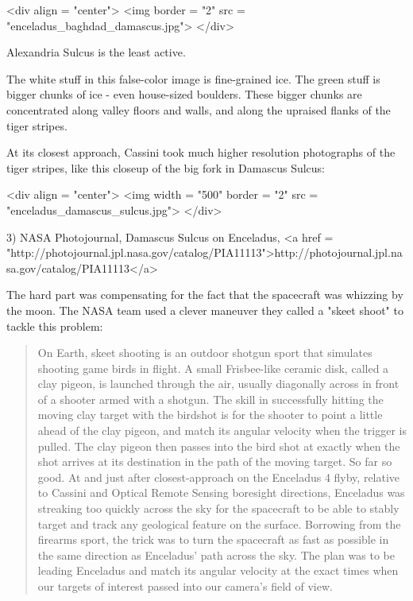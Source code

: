 <div align = "center">
<img border = "2" src = "enceladus_baghdad_damascus.jpg">
</div>

Alexandria Sulcus is the least active.  

The white stuff in this false-color image is fine-grained ice.  The
green stuff is bigger chunks of ice - even house-sized boulders.
These bigger chunks are concentrated along valley floors and walls, 
and along the upraised flanks of the tiger stripes.

At its closest approach, Cassini took much higher resolution
photographs of the tiger stripes, like this closeup of the big fork in
Damascus Sulcus:

<div align = "center">
<img width = "500" border = "2" src = "enceladus_damascus_sulcus.jpg">
</div>

3) NASA Photojournal, Damascus Sulcus on Enceladus,
<a href = "http://photojournal.jpl.nasa.gov/catalog/PIA11113">http://photojournal.jpl.nasa.gov/catalog/PIA11113</a>

The hard part was compensating for the fact that the spacecraft was
whizzing by the moon.  The NASA team used a clever maneuver they
called a "skeet shoot" to tackle this problem:

\begin{quote}
     On Earth, skeet shooting is an outdoor shotgun sport that           
     simulates shooting game birds in flight.  A small Frisbee-like 
     ceramic disk, called a clay pigeon, is launched through the air, 
     usually diagonally across in front of a shooter armed with a 
     shotgun.  The skill in successfully hitting the moving clay      
     target with the birdshot is for the shooter to point a little     
     ahead of the clay pigeon, and match its angular velocity when 
     the trigger is pulled.  The clay pigeon then passes into the 
     bird shot at exactly when the shot arrives at its destination 
     in the path of the moving target.  So far so good.  At and just
     after closest-approach on the Enceladus 4 flyby, relative to
     Cassini and Optical Remote Sensing boresight directions,
     Enceladus was streaking too quickly across the sky for the      
     spacecraft to be able to stably target and track any geological
     feature on the surface.  Borrowing from the firearms sport, the
     trick was to turn the spacecraft as fast as possible in the same
     direction as Enceladus' path across the sky.  The plan was to be
     leading Enceladus and match its angular velocity at the exact
     times when our targets of interest passed into our camera's 
     field of view.
\end{quote}

